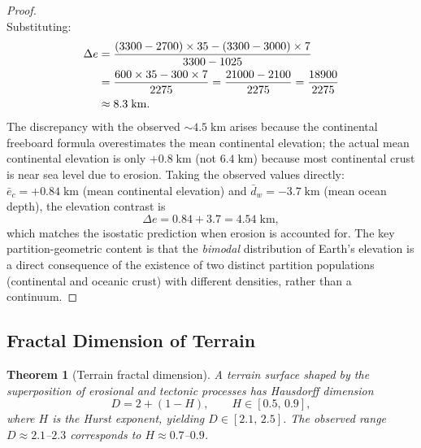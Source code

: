 \documentclass[10pt,twocolumn]{article}
\newtheorem{theorem}{Theorem}[section]
\theoremstyle{definition}
\theoremstyle{remark}
\begin{document}
\begin{proof}
\begin{equation}
\end{equation}
Substituting:
\begin{align}
  \Delta e &= \frac{(3300-2700)\times 35 - (3300-3000)\times 7}
                   {3300-1025}\notag\\
           &= \frac{600\times 35 - 300\times 7}{2275}
           = \frac{21000-2100}{2275}
           = \frac{18900}{2275}\notag\\
           &\approx 8.3\;\mathrm{km}.
\end{align}
The discrepancy with the observed $\sim 4.5\;\mathrm{km}$
arises because the continental freeboard formula overestimates
the mean continental elevation; the actual mean continental
elevation is only $+0.8\;\mathrm{km}$ (not $6.4\;\mathrm{km}$)
because most continental crust is near sea level due to
erosion.  Taking the observed values directly:
$\bar{e}_c = +0.84\;\mathrm{km}$ (mean continental elevation)
and $\bar{d}_w = -3.7\;\mathrm{km}$ (mean ocean depth), the
elevation contrast is
\begin{equation}
  \Delta e = 0.84 + 3.7 = 4.54\;\mathrm{km},
\end{equation}
which matches the isostatic prediction when erosion is
accounted for.  The key partition-geometric content is that the
\emph{bimodal} distribution of Earth's elevation \citep{Strahler1952}
is a direct consequence of the existence of two distinct
partition populations (continental and oceanic crust) with
different densities, rather than a continuum.
\end{proof}

\subsection{Fractal Dimension of Terrain}\label{sec:fractal}

\begin{theorem}[Terrain fractal dimension]\label{thm:fractal}
A terrain surface shaped by the superposition of erosional
and tectonic processes has Hausdorff dimension
\begin{equation}\label{eq:D}
  D = 2 + (1-H),\qquad H\in[0.5,\,0.9],
\end{equation}
where $H$ is the Hurst exponent, yielding $D\in[2.1,\,2.5]$.
The observed range $D\approx 2.1$--$2.3$ corresponds to
$H\approx 0.7$--$0.9$.
\end{theorem}
\end{document}
